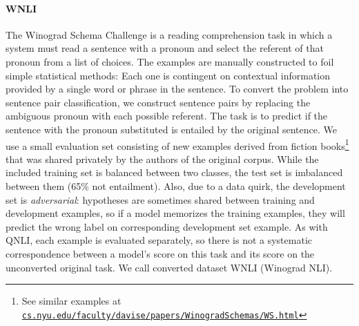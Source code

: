 \documentclass{article} \usepackage{iclr2019_conference,times}
\begin{document}
\paragraph{WNLI}
The Winograd Schema Challenge \citep{levesque2011winograd} is a reading comprehension task in which a system must read a sentence with a pronoun and select the referent of that pronoun from a list of choices. 
The examples are manually constructed to foil simple statistical methods: Each one is contingent on contextual information provided by a single word or phrase in the sentence. 
To convert the problem into sentence pair classification, we construct sentence pairs by replacing the ambiguous pronoun with each possible referent.
The task is to predict if the sentence with the pronoun substituted is entailed by the original sentence.
We use a small evaluation set consisting of new examples derived from fiction books\footnote{See similar examples at 
\href{https://cs.nyu.edu/faculty/davise/papers/WinogradSchemas/WS.html}{\tt cs.nyu.edu/\allowbreak faculty/\allowbreak davise/\allowbreak papers/\allowbreak WinogradSchemas/\allowbreak WS.html}} that was shared privately by the authors of the original corpus. 
While the included training set is balanced between two classes,  the test set is imbalanced between them (65\% not entailment). Also, due to a data quirk, the development set is \textit{adversarial}: hypotheses are sometimes shared between training and development examples, so if a model memorizes the training examples, they will predict the wrong label on corresponding development set example. As with QNLI, each example is evaluated separately, so there is not a systematic correspondence between a model's score on this task and its score on the unconverted original task.
We call converted dataset WNLI (Winograd NLI).
\end{document}
